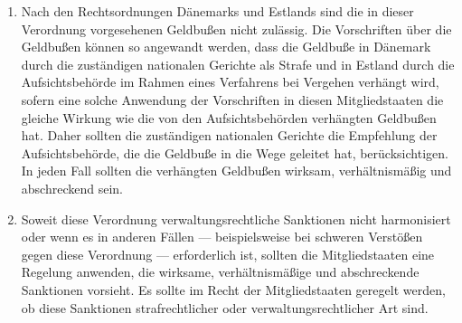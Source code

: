 \begin{enumerate}

   \item Nach den Rechtsordnungen Dänemarks und Estlands sind die in dieser Verordnung vorgesehenen Geldbußen nicht
    zulässig. Die Vorschriften über die Geldbußen können so angewandt werden, dass die Geldbuße in Dänemark durch die
    zuständigen nationalen Gerichte als Strafe und in Estland durch die Aufsichtsbehörde im Rahmen eines Verfahrens bei
    Vergehen verhängt wird, sofern eine solche Anwendung der Vorschriften in diesen Mitgliedstaaten die gleiche Wirkung
    wie die von den Aufsichtsbehörden verhängten Geldbußen hat. Daher sollten die zuständigen nationalen Gerichte die
    Empfehlung der Aufsichtsbehörde, die die Geldbuße in die Wege geleitet hat, berücksichtigen. In jeden Fall sollten
    die verhängten Geldbußen wirksam, verhältnismäßig und abschreckend sein.%
   \label{eg:151}
   

   \item Soweit diese Verordnung verwaltungsrechtliche Sanktionen nicht harmonisiert oder wenn es in anderen Fällen —
    beispielsweise bei schweren Verstößen gegen diese Verordnung — erforderlich ist, sollten die Mitgliedstaaten eine
    Regelung anwenden, die wirksame, verhältnismäßige und abschreckende Sanktionen vorsieht. Es sollte im Recht der
    Mitgliedstaaten geregelt werden, ob diese Sanktionen strafrechtlicher oder verwaltungsrechtlicher Art sind.%
   \label{eg:152}
   


\end{enumerate}
